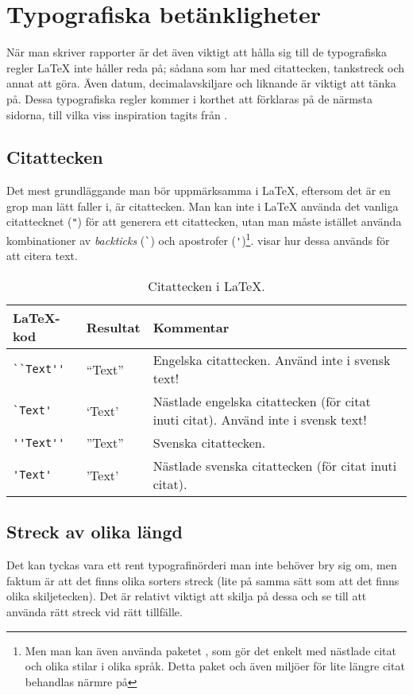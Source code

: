 \documentclass[10pt,../../a4.tex]{subfiles}
\begin{document}
\section{Typografiska betänkligheter}
När man skriver rapporter är det även viktigt att hålla sig till de
typografiska regler \LaTeX{} inte håller reda på; sådana som har med
citattecken, tankstreck och annat att göra. Även datum, decimalavskiljare
och liknande är viktigt att tänka på. Dessa typografiska regler kommer i
korthet att förklaras på de närmsta sidorna, till vilka viss inspiration 
tagits från \textcite{Schultz05}.

\subsection{Citattecken}
\label{sec:citattecken}
Det mest grundläggande man bör uppmärksamma i \LaTeX{}, eftersom det är en
grop man lätt faller i, är citattecken. Man kan inte i \LaTeX{} använda
det vanliga citattecknet (\verb|"|) för att generera ett citattecken, utan
man måste istället använda kombinationer av \emph{backticks} (\verb|`|)
och apostrofer (\verb|'|)\footnote{Men man kan även använda paketet
, som gör det enkelt med nästlade citat och olika stilar i
olika språk. Detta paket och även miljöer för lite längre citat behandlas
närmre på }.  visar hur dessa
används för att citera text.

\begin{table}[tbp]
	\centering 
	\caption{Citattecken i \LaTeX.}
	\label{tab:citat}
	\begin{tabular}{l l p{}}
		\toprule 
		\LaTeX-kod & Resultat & Kommentar \\ 
		\midrule 
		\verb|``Text''| & “Text” & Engelska citattecken. Använd inte i
		svensk text! \\
		\verb|`Text'| & ‘Text’ & Nästlade engelska citattecken (för citat
		inuti citat). Använd inte i svensk text! \\ 
		\verb|''Text''| & ”Text” & Svenska citattecken. \\
		\verb|'Text'| & ’Text’ & Nästlade svenska citattecken (för citat
		inuti citat). \\
		\bottomrule 
	\end{tabular}
\end{table}

\subsection{Streck av olika längd}
Det kan tyckas vara ett rent typografinörderi man inte behöver bry sig om,
men faktum är att det finns olika sorters streck (lite på samma sätt som
att det finns olika skiljetecken). Det är relativt viktigt att skilja på
dessa och se till att använda rätt streck vid rätt tillfälle.
\end{document}
